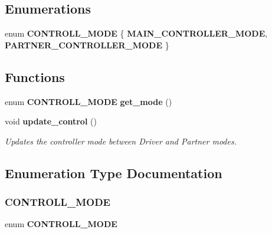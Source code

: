 \subsection*{Enumerations}
\begin{DoxyCompactItemize}
\item 
enum \textbf{ C\+O\+N\+T\+R\+O\+L\+L\+\_\+\+M\+O\+DE} \{ \textbf{ M\+A\+I\+N\+\_\+\+C\+O\+N\+T\+R\+O\+L\+L\+E\+R\+\_\+\+M\+O\+DE}, 
\textbf{ P\+A\+R\+T\+N\+E\+R\+\_\+\+C\+O\+N\+T\+R\+O\+L\+L\+E\+R\+\_\+\+M\+O\+DE}
 \}
\end{DoxyCompactItemize}
\subsection*{Functions}
\begin{DoxyCompactItemize}
\item 
enum \textbf{ C\+O\+N\+T\+R\+O\+L\+L\+\_\+\+M\+O\+DE} \textbf{ get\+\_\+mode} ()
\item 
void \textbf{ update\+\_\+control} ()
\begin{DoxyCompactList}\small\item\em Updates the controller mode between Driver and Partner modes. \end{DoxyCompactList}\end{DoxyCompactItemize}


\subsection{Enumeration Type Documentation}
\mbox{\label{partner_8h_afb2b5bca5ceab5f6efd8bac14a568324}} 
\subsubsection{C\+O\+N\+T\+R\+O\+L\+L\+\_\+\+M\+O\+DE}
{\footnotesize\ttfamily enum \textbf{ C\+O\+N\+T\+R\+O\+L\+L\+\_\+\+M\+O\+DE}}

